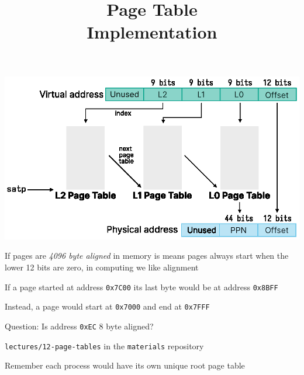 

\title{Page Table\\Implementation}


  \begin{frame}
    \titlepage
  \end{frame}

  \begin{slide}


    \centering
    \includegraphics{../12-page-tables/multi-level-page-table.eps}

  \end{slide}

  \begin{slide}
    

    If pages are \textit{4096 byte aligned} in memory is means pages always
    start when the lower 12 bits are zero, in computing we like alignment
    \medskip

    If a page started at address \texttt{0x7C00} its last byte would be at
    address \texttt{0x8BFF}
    \medskip

    Instead, a page would start at \texttt{0x7000} and end at \texttt{0x7FFF}
    \bigskip

    Question: Is address \texttt{0xEC} 8 byte aligned?
  \end{slide}

  \begin{slide}
    

    \texttt{lectures/12-page-tables} in the \texttt{materials} repository
    \medskip

    Remember each process would have its own unique root page table

  \end{slide}

